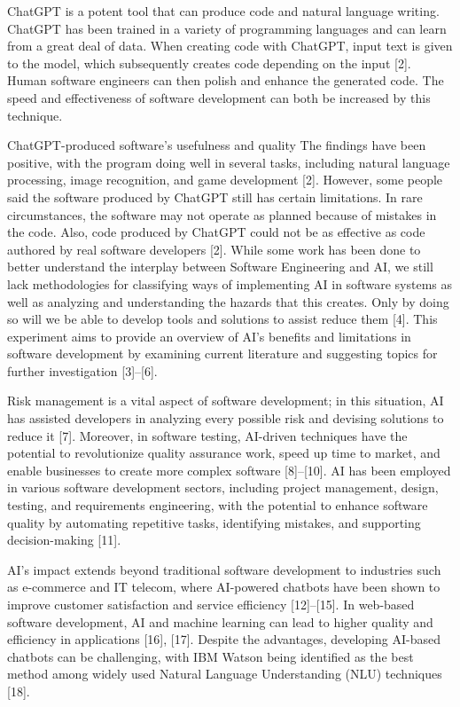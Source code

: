 \documentclass[conference]{IEEEtran}
\begin{document}
ChatGPT is a potent tool that can produce code and natural language writing. ChatGPT has been trained in a variety of programming languages and can learn from a great deal of data. When creating code with ChatGPT, input text is given to the model, which subsequently creates code depending on the input [2]. Human software engineers can then polish and enhance the generated code. The speed and effectiveness of software development can both be increased by this technique.

ChatGPT-produced software's usefulness and quality The findings have been positive, with the program doing well in several tasks, including natural language processing, image recognition, and game development [2]. However, some people said the software produced by ChatGPT still has certain limitations. In rare circumstances, the software may not operate as planned because of mistakes in the code. Also, code produced by ChatGPT could not be as effective as code authored by real software developers [2]. While some work has been done to better understand the interplay between Software Engineering and AI, we still lack methodologies for classifying ways of implementing AI in software systems as well as analyzing and understanding the hazards that this creates. Only by doing so will we be able to develop tools and solutions to assist reduce them [4]. This experiment aims to provide an overview of AI's benefits and limitations in software development by examining current literature and suggesting topics for further investigation [3]–[6]. 

Risk management is a vital aspect of software development; in this situation, AI has assisted developers in analyzing every possible risk and devising solutions to reduce it [7]. Moreover, in software testing, AI-driven techniques have the potential to revolutionize quality assurance work, speed up time to market, and enable businesses to create more complex software [8]–[10]. AI has been employed in various software development sectors, including project management, design, testing, and requirements engineering, with the potential to enhance software quality by automating repetitive tasks, identifying mistakes, and supporting decision-making [11].

AI's impact extends beyond traditional software development to industries such as e-commerce and IT telecom, where AI-powered chatbots have been shown to improve customer satisfaction and service efficiency [12]–[15]. In web-based software development, AI and machine learning can lead to higher quality and efficiency in applications [16], [17]. Despite the advantages, developing AI-based chatbots can be challenging, with IBM Watson being identified as the best method among widely used Natural Language Understanding (NLU) techniques [18].
\end{document}
